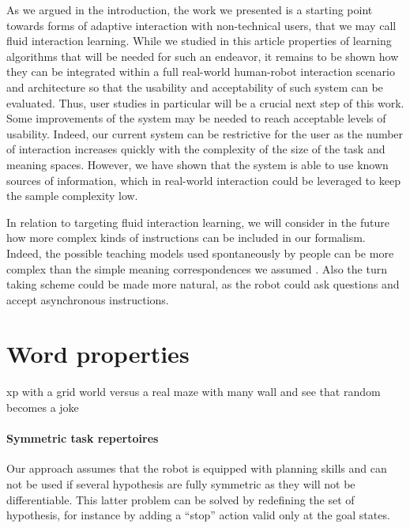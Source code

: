As we argued in the introduction, the work we presented is a starting point towards forms of adaptive interaction with non-technical users, that we may call fluid interaction learning. While we studied in this article properties of learning algorithms that will be needed for such an endeavor, it remains to be shown how they can be integrated within a full real-world human-robot interaction scenario and architecture so that the usability and acceptability of such system can be evaluated. Thus, user studies in particular will be a crucial next step of this work. Some improvements of the system may be needed to reach acceptable levels of usability.
Indeed, our current system can be restrictive for the user as the number of interaction increases quickly with the complexity of the size of the task and meaning spaces. However, we have shown that the system is able to use known sources of information, which in real-world interaction could be leveraged to keep the sample complexity low.

In relation to targeting fluid interaction learning, we will consider in the future how more complex kinds of instructions can be included in our formalism. Indeed, the possible teaching models used spontaneously by people can be more complex than the simple meaning correspondences we assumed \cite{thomaz2008teachable,Cakmak2010optimality}. Also the turn taking scheme could be made more natural, as the robot could ask questions \cite{cakmak2012designing} and accept asynchronous instructions.

\section{Word properties}
xp with a grid world versus a real maze with many wall and see that random becomes a joke

\paragraph{Symmetric task repertoires} Our approach assumes that the robot is equipped with planning skills and can not be used if several hypothesis are fully symmetric as they will not be differentiable. This latter problem can be solved by redefining the set of hypothesis, for instance by adding a ``stop'' action valid only at the goal states.

